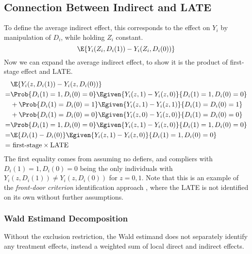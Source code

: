 \subsection{Connection Between Indirect and LATE}
\label{sec:acme-late}
To define the average indirect effect, this corresponds to the effect on $Y_i$ by manipulation of $D_i$, while holding $Z_i$ constant.
\[ \E{ Y_i(Z_i, D_i(1)) - Y_i(Z_i, D_i(0)) } \]
Now we can expand the average indirect effect, to show it is the product of first-stage effect and LATE.
\begin{align*}
    &\E{ Y_i(z, D_i(1)) - Y_i(z, D_i(0)) } \\
    =& 
    \Prob{D_i(1) = 1, D_i(0) = 0}
    \Egiven{ Y_i(z, 1) - Y_i(z, 0) }{
        D_i(1) = 1, D_i(0) = 0} \\
    & + \Prob{D_i(1) = D_i(0) = 1}
    \Egiven{ Y_i(z, 1) - Y_i(z, 1) }{ D_i(1) = D_i(0) = 1} \\
    & + \Prob{D_i(1) = D_i(0) = 0}
    \Egiven{ Y_i(z, 0) - Y_i(z, 0) }{
        D_i(1) = D_i(0) = 0} \\
    =& \Prob{D_i(1) = 1, D_i(0) = 0}
    \Egiven{ Y_i(z, 1) - Y_i(z, 0) }{
        D_i(1) = 1, D_i(0) = 0} \\
    =& \E{D_i(1) - D_i(0)}
    \Egiven{ Y_i(z, 1) - Y_i(z, 0) }{ D_i(1) = 1, D_i(0) = 0} \\
    =& \text{ first-stage} \times \text{LATE} \\
\end{align*}
The first equality comes from assuming no defiers, and compliers with $D_i(1) = 1, D_i(0) = 0$ being the only individuals with $Y_i(z, D_i(1)) \neq Y_i(z, D_i(0))$ for $z = 0,1$.
Note that this is an example of the \textit{front-door criterion} identification approach \citep{pearl2003direct}, where the LATE is not identified on its own without further assumptions.

\subsubsection{Wald Estimand Decomposition}
Without the exclusion restriction, the Wald estimand does not separately identify any treatment effects, instead a weighted sum of local direct and indirect effects.

